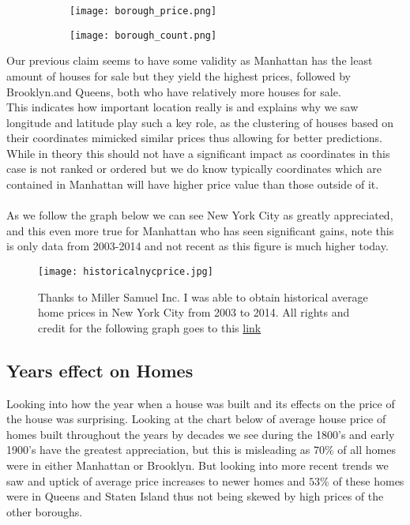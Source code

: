 \documentclass{article}
\begin{document}
\begin{titlepage}
\begin{figure}[ht]

\begin{subfigure}{.5\textwidth}
\texttt{[image: borough\_price.png]}
\label{fig:subim3}
\end{subfigure}
\begin{subfigure}{.5\textwidth}
\texttt{[image: borough\_count.png]}
\label{fig:subim4}
\end{subfigure}
\newline
\label{fig:image3}
\end{figure}


Our previous claim seems to have some validity as Manhattan has the least amount of houses for sale but they yield the highest prices, followed by Brooklyn.and Queens, both who have relatively more houses for sale. \\

This indicates how important location really is and explains why we saw longitude and latitude play such a key role, as the clustering of houses based on their coordinates mimicked similar prices thus allowing for better predictions. While in theory this should not have a significant impact as coordinates in this case is not ranked or ordered but we do know typically coordinates which are contained in Manhattan will have higher price value than those outside of it.\\
\\
As we follow the graph below we can see New York City as greatly appreciated, and this even more true for Manhattan who has seen significant gains, note this is only data from 2003-2014 and not recent as this figure is much higher today.
\begin{figure}[ht]

\texttt{[image: historicalnycprice.jpg]}
\caption{Thanks to Miller Samuel Inc. I was able to obtain historical average home prices in New York City from 2003 to 2014. All rights and credit for the following graph goes to this \href{https://www.millersamuel.com/charts/new-york-city-residential-average-sales-price-includingexcluding-manhattan/}{link}}

\end{figure}

\subsection{Years effect on Homes}
Looking into how the year when a house was built and its effects  on the price of the house was surprising. Looking at the chart below of average house price of homes built throughout the years by decades we see during the 1800's and early 1900's have the greatest appreciation, but this is misleading as $70\%$ of all homes were in either Manhattan or Brooklyn. But looking into more recent trends we saw and uptick of average price increases to newer homes and $53\%$ of these homes were in Queens and Staten Island thus not being skewed by high prices of the other boroughs.


\end{titlepage}
\end{document}
